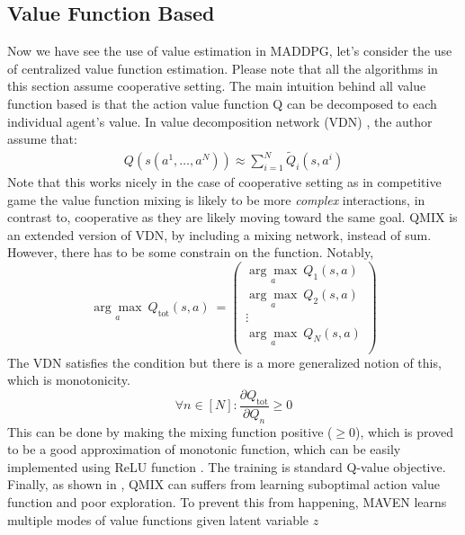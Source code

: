 \subsection{Value Function Based}
Now we have see the use of value estimation in MADDPG, let's consider the use of centralized value function estimation. Please note that all the algorithms in this section assume cooperative setting. The main intuition behind all value function based is that the action value function Q can be decomposed to each individual agent's value. In value decomposition network (VDN) \cite{sunehag2017value}, the author assume that:
\begin{equation}
\begin{aligned}
Q(s (a^1, \dots, a^N)) \approx \sum^N_{i=1} \tilde{Q}_i(s, a^i)
\end{aligned} 
\end{equation}
Note that this works nicely in the case of cooperative setting as in competitive game the value function mixing is likely to be more \textit{complex} interactions, in contrast to, cooperative as they are likely moving toward the same goal. QMIX \cite{rashid2018qmix} is an extended version of VDN, by including a mixing network, instead of sum. However, there has to be some constrain on the function. Notably, 
\begin{equation}
\underset{a}{\arg\max} \ Q_{\text{tot}}(s, a) \ = \begin{pmatrix}
	\underset{a}{\arg\max} \ Q_1(s, a) \\ \underset{a}{\arg\max} \ Q_2(s, a) \\ \vdots \\ \underset{a}{\arg\max} \ Q_N(s, a) \\
\end{pmatrix}
\end{equation}
The VDN satisfies the condition but there is a more generalized notion of this, which is monotonicity. 
\begin{equation}
\forall n \in [N] : \frac{\partial Q_{\text{tot}}}{\partial Q_{n}} \ge 0
\end{equation}
This can be done by making the mixing function positive ($\ge 0$), which is proved to be a good approximation of monotonic function, which can be easily implemented using ReLU function \cite{nair2010rectified}. The training is standard Q-value objective. Finally, as shown in \cite{mahajan2019maven}, QMIX can suffers from learning suboptimal action value function and poor exploration. To prevent this from happening, MAVEN \cite{mahajan2019maven} learns multiple modes of value functions given latent variable $z$
